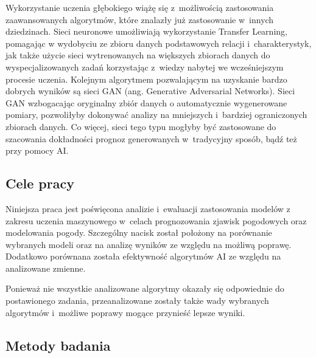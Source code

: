 Wykorzystanie uczenia głębokiego wiążę się z~możliwością zastosowania 
zaawansowanych algorytmów, które znalazły już zastosowanie w~innych dziedzinach.
Sieci neuronowe umożliwiają wykorzystanie Transfer Learning, pomagając w
wydobyciu ze zbioru danych podstawowych relacji i~charakterystyk, jak także
użycie sieci wytrenowanych na większych zbiorach danych do wyspecjalizowanych
zadań korzystając z~wiedzy nabytej we wcześniejszym procesie uczenia. Kolejnym 
algorytmem pozwalającym na uzyskanie bardzo dobrych wyników są sieci GAN (ang. 
Generative Adversarial Networks). Sieci GAN wzbogacając oryginalny zbiór danych o
automatycznie wygenerowane pomiary, pozwoliłyby dokonywać analizy na mniejszych i~bardziej ograniczonych zbiorach danych. Co więcej, sieci tego typu mogłyby
być zastosowane do szacowania dokładności prognoz generowanych w~tradycyjny sposób,
bądź też przy pomocy AI.


\subsection{Cele pracy}


Niniejsza praca jest poświęcona analizie i~ewaluacji zastosowania modelów 
z zakresu uczenia maszynowego w~celach prognozowania zjawisk pogodowych oraz
modelowania pogody. Szczególny nacisk został położony na porównanie wybranych
modeli oraz na analizę wyników ze względu na możliwą poprawę. Dodatkowo 
porównana została efektywność algorytmów AI ze względu na analizowane zmienne.

Ponieważ nie wszystkie analizowane algorytmy okazały się odpowiednie do postawionego
zadania, przeanalizowane zostały także wady wybranych algorytmów i~możliwe poprawy
mogące przynieść lepsze wyniki.

\subsection{Metody badania}

